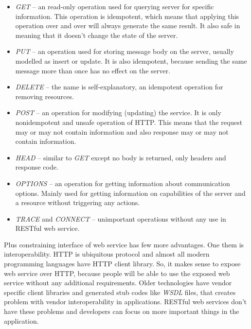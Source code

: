 \documentclass[12pt,final,oneside]{fithesis2}
\begin{document}
\begin{itemize}
\item
\textit{GET} -- an read-only operation used for querying server for specific information. This operation is idempotent, which means that applying this operation over and over will always generate the same result. It also safe in meaning that it doesn't change the state of the server.

\item
\textit{PUT} -- an operation used for storing message body on the server, usually modelled as insert or update. It is also idempotent, because sending the same message more than once has no effect on the server.

\item
\textit{DELETE} -- the name is self-explanatory, an idempotent operation for removing resources.

\item
\textit{POST} -- an operation for modifying (updating) the service. It is only nonidempotent and unsafe operation of HTTP. This means that the request may or may not contain information and also response may or may not contain information.

\item
\textit{HEAD} -- similar to \textit{GET} except no body is returned, only headers and response code.

\item
\textit{OPTIONS} -- an operation for getting information about communication options. Mainly used for getting information on capabilities of the server and a resource without triggering any actions.

\item
\textit{TRACE} and \textit{CONNECT} -- unimportant operations without any use in RESTful web service.
\end{itemize}

Plus constraining interface of web service has few more advantages. One them is interoperability. HTTP is ubiquitous protocol and almost all modern programming languages have HTTP client library. So, it makes sense to expose web service over HTTP, because people will be able to use the exposed web service without any additional requirements. Older technologies have vendor specific client libraries and generated stub codes like \textit{WSDL} files, that creates problem with vendor interoperability in applications. RESTful web services don't have these problems and developers can focus on more important things in the application.
\end{document}

